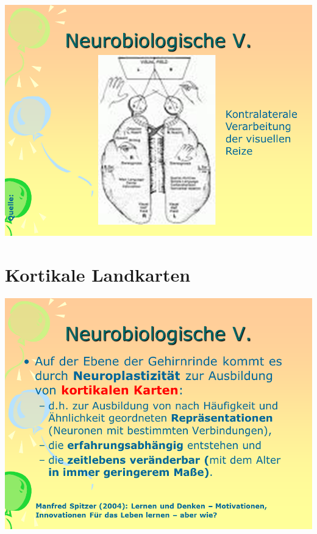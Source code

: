 \documentclass[
  letterpaper,
]{scrbook}
\begin{document}
\includegraphics[width=1\textwidth,height=\textheight]{./pictures/neuro/Diapozitiv28.PNG}

\hypertarget{kortikale-landkarten}{%
\section{Kortikale Landkarten}\label{kortikale-landkarten}}

\includegraphics[width=1\textwidth,height=\textheight]{./pictures/neuro/Diapozitiv30.PNG}
\end{document}
